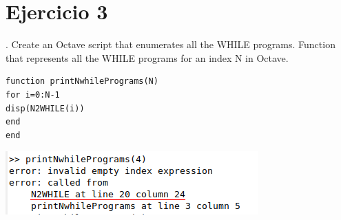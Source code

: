 \documentclass{article}
\begin{document}
\section{Ejercicio 3}
. Create an Octave script that enumerates all the WHILE programs.
\newline
Function that represents all the WHILE programs for an index N in Octave.
\begin{verbatim}
function printNwhilePrograms(N)
for i=0:N-1
disp(N2WHILE(i))
end
end
\end{verbatim}
\includegraphics{imagen_2022-12-26_180329923.png}
\end{document}
